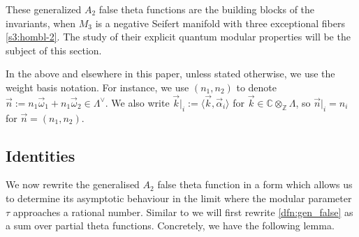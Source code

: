 \documentclass[10pt,a4paper]{amsart}
\newcommand{\CC}{\mathbb{C}}
\newcommand{\ZZ}{\mathbb{Z}}
\def\bv{{\vec{\underline{b}}}}
\theoremstyle{definition}
\numberwithin{equation}{section}
\begin{document}
These generalized $A_2$ false theta functions are the building blocks of the \smash{$\widehat Z^{{\rm SU}(3)}_\bv(M_3)$} invariants, when $M_3$ is a negative Seifert manifold with three exceptional fibers \eqref{s3:hombl-2}. The study of their explicit quantum modular properties will be the subject of this section.


In the above and elsewhere in this paper, unless stated otherwise, we use the weight basis notation. For instance, we use $(n_1, n_2)$ to denote $\vec n := n_1\vec \omega_1 + n_1\vec \omega_2 \in \Lambda^\vee$. We also write $\vec k\lvert_i := \langle \vec k, \vec \alpha_i\rangle$ for $\vec k\in \CC\otimes_{\ZZ}\Lambda$, so $\vec n\lvert_i =n_i$ for $\vec n=(n_1,n_2)$.



\subsection{Identities}
\label{subsec:defns}

We now rewrite the generalised $A_2$ false theta function in a form which allows us to determine its asymptotic behaviour in the limit where the modular parameter $\tau$ approaches a rational number. Similar to \cite{bringmann2018higher} we will first rewrite \eqref{dfn:gen_false} as a sum over partial theta functions. Concretely, we have the following lemma.
\end{document}

